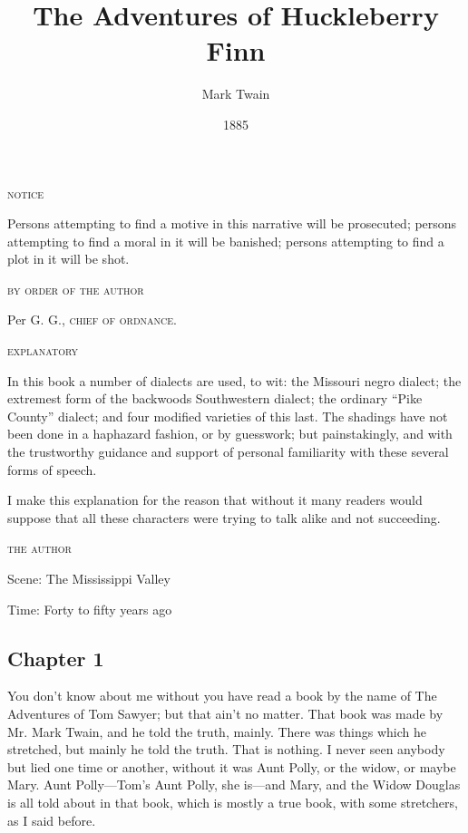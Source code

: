 \documentclass[10pt,a4paper]{article}
\begin{document}
\title{The Adventures of Huckleberry Finn}
\date{1885}
\author{Mark Twain}
\maketitle

\setcounter{page}{1}

\begin{center}
  \textsc{notice}
\end{center}

Persons attempting to find a motive in this narrative will be prosecuted; persons attempting to find a moral in it will be banished; persons attempting to find a plot in it will be shot.

\begin{flushright}
\textsc{by order of the author}

Per \textsc{G. G., chief of ordnance.}
\end{flushright}

\begin{center}
\textsc{explanatory}
\end{center}

In this book a number of dialects are used, to wit: the Missouri negro dialect; the extremest form of the backwoods Southwestern dialect; the ordinary “Pike County” dialect; and four modified varieties of this last. The shadings have not been done in a haphazard fashion, or by guesswork; but painstakingly, and with the trustworthy guidance and support of personal familiarity with these several forms of speech.

I make this explanation for the reason that without it many readers would suppose that all these characters were trying to talk alike and not succeeding.

\begin{flushright}
  \textsc{the author}
\end{flushright}

\vspace{2.5em}
\begin{center}
Scene: The Mississippi Valley

Time: Forty to fifty years ago
\end{center}
\vspace{1.4em}
\subsection{Chapter 1}
\linenumbers You don’t know about me without you have read a book by the name of The Adventures of Tom Sawyer; but that ain’t no matter. That book was made by Mr. Mark Twain, and he told the truth, mainly. There was things which he stretched, but mainly he told the truth. That is nothing. I never seen anybody but lied one time or another, without it was Aunt Polly, or the widow, or maybe Mary. Aunt Polly—Tom’s Aunt Polly, she is—and Mary, and the Widow Douglas is all told about in that book, which is mostly a true book, with some stretchers, as I said before.
\end{document}
